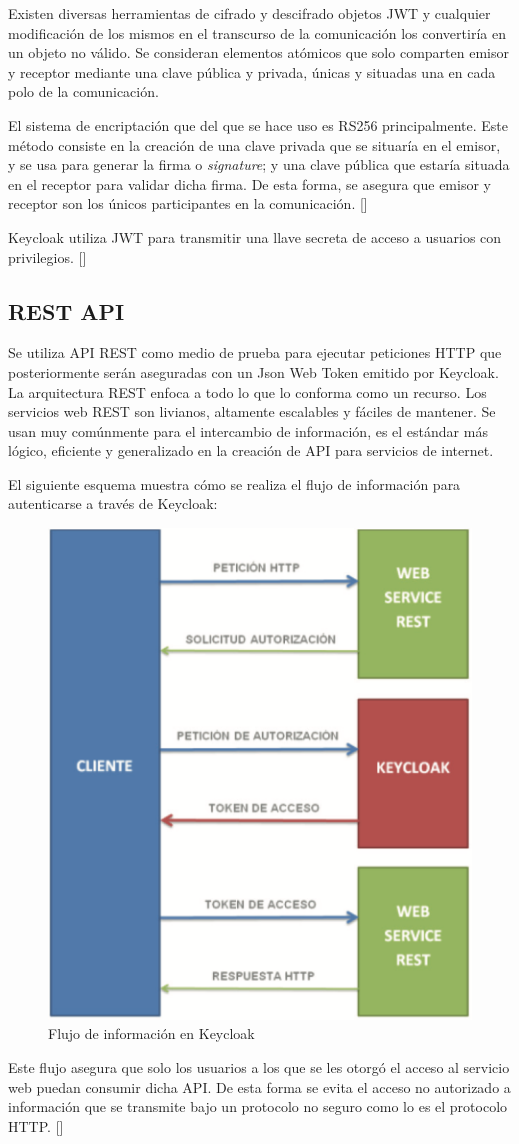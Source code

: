 Existen diversas herramientas de cifrado y descifrado objetos JWT y cualquier modificación de los mismos en el transcurso de la comunicación los convertiría en un objeto no válido. Se consideran elementos atómicos que solo comparten emisor y receptor mediante una clave pública y privada, únicas y situadas una en cada polo de la comunicación. 

El sistema de encriptación que del que se hace uso es RS256 principalmente. Este método consiste en la creación de una clave privada que se situaría en el emisor, y se usa para generar la firma o \textit{signature}; y una clave pública que estaría situada en el receptor para validar dicha firma. De esta forma, se asegura que emisor y receptor son los únicos participantes en la comunicación. [\cite{lobato2022regulacion}]

 Keycloak utiliza JWT para transmitir una llave secreta de acceso a usuarios con privilegios. [\cite{muyon2020metodos}]


\subsection{REST API}
Se utiliza API REST como medio de prueba para ejecutar peticiones HTTP que posteriormente serán aseguradas con un Json Web Token emitido por Keycloak. La arquitectura REST enfoca a todo lo que lo conforma como un recurso. Los servicios web REST son livianos, altamente escalables y fáciles de mantener. Se usan muy comúnmente para el intercambio de información, es el estándar más lógico, eficiente y generalizado en la creación de API para servicios de internet.

El siguiente esquema muestra cómo se realiza el flujo de información para autenticarse a través de Keycloak:

\begin{figure}[H]
	\centering
	\includegraphics[width=0.7\linewidth]{Graphics/keycloak_info_flux}
	\caption{Flujo de información en Keycloak}
	\label{fig:Flujo de Información en Keycloak}
\end{figure}

Este flujo asegura que solo los usuarios a los que se les otorgó el acceso al servicio web puedan consumir dicha API. De esta forma se evita el acceso no autorizado a información que se transmite bajo un protocolo no seguro como lo es el protocolo HTTP. [\cite{muyon2020metodos}]
